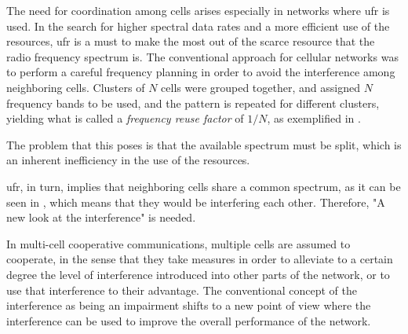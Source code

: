 The need for coordination among cells arises especially in networks where \gls{ufr}
is used. In the search for higher spectral data rates and a more efficient use of
the resources, \gls{ufr} is a must to make the most out of the scarce
resource that the radio frequency spectrum is. The conventional approach for
cellular networks was to perform a careful frequency planning in order to avoid
the interference among neighboring cells. Clusters of $N$ cells were grouped
together, and assigned $N$ frequency bands to be used, and the pattern is repeated
for different clusters, yielding what is called a \emph{frequency reuse factor}
of $1 / N$, as exemplified in .

The problem that this poses is that the available spectrum must be split, which
is an inherent inefficiency in the use of the resources.

\gls{ufr}, in turn, implies that neighboring cells share a common spectrum, as it
can be seen in , which means that they would be interfering each
other. Therefore, "A new look at the interference" \cite{gesbert10} is needed.

In multi-cell cooperative communications, multiple cells are assumed to cooperate,
in the sense that they take measures in order to alleviate to a certain degree the
level of interference introduced into other parts of the network, or to use that
interference to their advantage. The conventional concept of the interference as
being an impairment shifts to a new point of view where the interference can be
used to improve the overall performance of the network.
